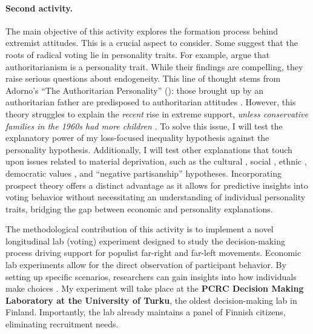 \documentclass[letterpaper]{article}
\begin{document}
\paragraph{Second activity.} The main objective of this activity explores the formation process behind extremist attitudes. This is a crucial aspect to consider. Some suggest that the roots of radical voting lie in personality traits. For example, \textcite[p. 1]{Cohen2016} argue that authoritarianism is a personality trait. While their findings are compelling, they raise serious questions about endogeneity. This line of thought stems from Adorno's ``The Authoritarian Personality'' (\citeyear{Adorno1950}): those brought up by an authoritarian father are predisposed to authoritarian attitudes \parencite{Helminen2023}. However, this theory struggles to explain the \emph{recent} rise in extreme support, \emph{unless conservative families in the 1960s had more children} \parencite[p. 218]{Mudde2007b}. To solve this issue, I will test the explanatory power of my loss-focused inequality hypothesis against the personality hypothesis. Additionally, I will test other explanations that touch upon issues related to material deprivation, such as the cultural \parencite{Engler2021,Veugelers2002}, social \parencite{Gidron2017a}, ethnic \parencite{Helske2023}, democratic values \parencite{Lipset1981,Carlin2015}, and ``negative partisanship'' \parencite{Mudde2018} hypotheses. Incorporating prospect theory offers a distinct advantage as it allows for predictive insights into voting behavior without necessitating an understanding of individual personality traits, bridging the gap between economic and personality explanations.

\vspace{2mm}The methodological contribution of this activity is to implement a novel longitudinal lab (voting) experiment designed to study the decision-making process driving support for populist far-right and far-left movements. Economic lab experiments allow for the direct observation of participant behavior. By setting up specific scenarios, researchers can gain insights into how individuals make choices \parencite{Kahneman:2012tc}. My experiment will take place at the {\bf PCRC Decision Making Laboratory at the University of Turku}, the oldest decision-making lab in Finland.  Importantly, the lab already maintains a panel of Finnish citizens, eliminating recruitment needs. 
\end{document}
